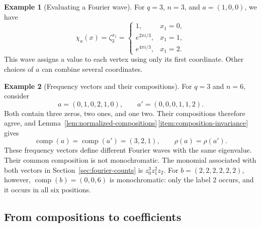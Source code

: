 \documentclass[11pt,a4paper]{article}
\numberwithin{equation}{section}
\numberwithin{figure}{section}
\numberwithin{table}{section}
\numberwithin{footnote}{section}
\theoremstyle{informal}\newtheorem*{informaltheorem}{Informal theorem}
\theoremstyle{definition}\newtheorem{example}{Example}[section]
\theoremstyle{remark}\newtheorem{remark}[theorem]{Remark}
\begin{document}
\begin{example}[Evaluating a Fourier wave]\label{ex:fourier-wave}
For \(q=3\), \(n=3\), and \(a=(1,0,0)\), we have
\begin{equation}
 \chi_a(x)=\zeta_3^{x_1}
 =\begin{cases}
  1,&x_1=0,\\
  e^{2\pi i/3},&x_1=1,\\
  e^{4\pi i/3},&x_1=2.
 \end{cases}
\end{equation}
This wave assigns a value to each vertex using only its first
coordinate. Other choices of \(a\) can combine several coordinates.
\end{example}

\begin{example}[Frequency vectors and their compositions]\label{ex:frequency-composition}
For \(q=3\) and \(n=6\), consider
\begin{equation}
 a=(0,1,0,2,1,0),\qquad a'=(0,0,0,1,1,2).
\end{equation}
Both contain three zeros, two ones, and one two. Their compositions
therefore agree, and
Lemma~\ref{lem:normalized-compositions}\,\ref{item:composition-invariance} gives
\begin{equation}
 \operatorname{comp}(a)=\operatorname{comp}(a')=(3,2,1),
 \qquad \rho(a)=\rho(a').
\end{equation}
These frequency vectors define different Fourier waves with the
same eigenvalue. Their common composition is not monochromatic.
The monomial associated with both vectors in
Section~\ref{sec:fourier-counts} is \(z_0^3z_1^2z_2\).
For \(b=(2,2,2,2,2,2)\), however,
\(\operatorname{comp}(b)=(0,0,6)\) is monochromatic: only the
label \(2\) occurs, and it occurs in all six positions.
\end{example}

\subsection{From compositions to coefficients}
\label{app:example-coefficients}
\end{document}
